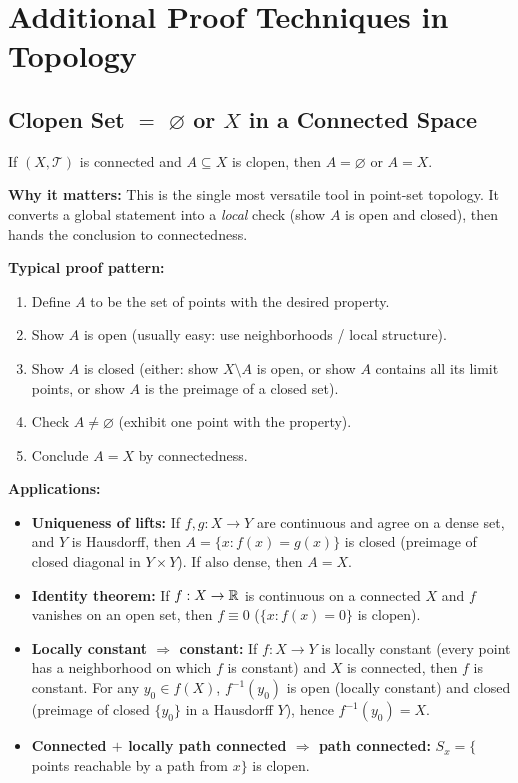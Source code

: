 \documentclass{article}
\begin{document}
\section{Additional Proof Techniques in Topology}

\subsection{Clopen Set $=$ $\varnothing$ or $X$ in a Connected Space}
\begin{theorem}
  If $(X,\mathcal{T})$ is connected and $A \subseteq X$ is clopen, then
  $A = \varnothing$ or $A = X$.
\end{theorem}
\textbf{Why it matters:} This is the single most versatile tool in
point-set topology. It converts a global statement into a \emph{local}
check (show $A$ is open and closed), then hands the conclusion to
connectedness.

\textbf{Typical proof pattern:}
\begin{enumerate}
  \item Define $A$ to be the set of points with the desired property.
  \item Show $A$ is open (usually easy: use neighborhoods / local structure).
  \item Show $A$ is closed (either: show $X \setminus A$ is open, or
      show $A$ contains all its limit points, or show $A$ is the preimage
    of a closed set).
  \item Check $A \ne \varnothing$ (exhibit one point with the property).
  \item Conclude $A = X$ by connectedness.
\end{enumerate}

\textbf{Applications:}
\begin{itemize}
  \item \textbf{Uniqueness of lifts:} If $f, g : X \to Y$ are continuous
    and agree on a dense set, and $Y$ is Hausdorff, then $A = \{x :
    f(x) = g(x)\}$ is closed (preimage of closed diagonal in $Y \times
    Y$). If also dense, then $A = X$.
  \item \textbf{Identity theorem:} If $f : X \to \mathbb{R}$ is continuous on a
    connected $X$ and $f$ vanishes on an open set, then $f \equiv 0$
    ($\{x : f(x) = 0\}$ is clopen).
  \item \textbf{Locally constant $\Rightarrow$ constant:} If $f : X \to
    Y$ is locally constant (every point has a neighborhood on which $f$
    is constant) and $X$ is connected, then $f$ is constant. For any
    $y_0 \in f(X)$, $f^{-1}(y_0)$ is open (locally constant) and closed
    (preimage of closed $\{y_0\}$ in a Hausdorff $Y$), hence $f^{-1}(y_0) = X$.
  \item \textbf{Connected $+$ locally path connected $\Rightarrow$ path
    connected:} $S_x = \{$points reachable by a path from $x\}$ is clopen.
\end{itemize}
\end{document}
